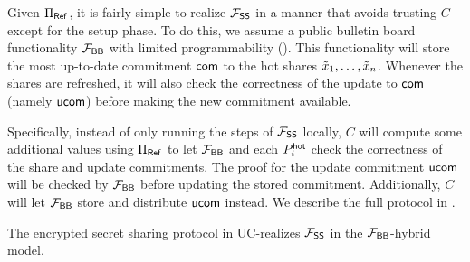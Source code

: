 Given $\Pi_{\sf Ref}$, it is fairly simple to realize $\mathcal{F}_\mathsf{SS}$ in a manner that avoids trusting $C$ except for the setup phase.
To do this, we assume a public bulletin board functionality $\mathcal{F}_\mathsf{BB}$ with limited programmability (). This functionality will store the most up-to-date commitment $\mathsf{com}$ to the hot shares $\tilde{x}_1, \dots, \tilde{x}_n$. Whenever the shares are refreshed, it will also check the correctness of the update to $\mathsf{com}$ (namely $\mathsf{ucom}$) before making the new commitment available.

Specifically, instead of only running the steps of $\mathcal{F}_\mathsf{SS}$ locally, $C$ will compute some additional values using $\Pi_{\sf Ref}$ to let $\mathcal{F}_\mathsf{BB}$ and each $P_i^{\mathsf{hot}}$ check the correctness of the share and update commitments. 
The proof for the update commitment $\mathsf{ucom}$ will be checked by $\mathcal{F}_\mathsf{BB}$ before updating the stored commitment. 
Additionally, $C$ will let $\mathcal{F}_\mathsf{BB}$ store and distribute $\mathsf{ucom}$ instead. 
We describe the full protocol in . %




\begin{theorem}\label{thm:fs-protocol}
The encrypted secret sharing protocol in  UC-realizes $\mathcal{F}_\mathsf{SS}$ in the $\mathcal{F}_\mathsf{BB}$-hybrid model.
\end{theorem}


